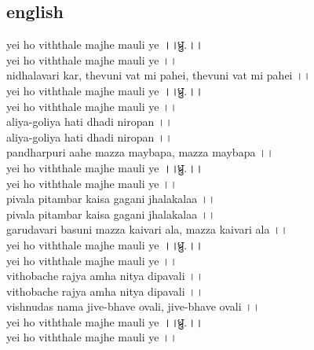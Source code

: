\documentclass[letterpaper,twocolumn,openany,nodeprecatedcode]{dndbook}
\begin{document}
\begin{flushleft}
  \subsection*{english}
  yei ho viththale majhe mauli ye ।।ध्रु.।।\\
  yei ho viththale majhe mauli ye ।।\\
  nidhalavari kar, thevuni vat mi pahei, thevuni vat mi pahei ।।\\
  yei ho viththale majhe mauli ye ।।ध्रु.।।\\
  yei ho viththale majhe mauli ye ।।\\
  aliya-goliya hati dhadi niropan ।।\\
  aliya-goliya hati dhadi niropan ।।\\
  pandharpuri aahe mazza maybapa, mazza maybapa ।।\\
  yei ho viththale majhe mauli ye ।।ध्रु.।।\\
  yei ho viththale majhe mauli ye ।।\\
  pivala pitambar kaisa gagani jhalakalaa ।।\\
  pivala pitambar kaisa gagani jhalakalaa ।।\\
  garudavari basuni mazza kaivari ala, mazza kaivari ala ।।\\
  yei ho viththale majhe mauli ye ।।ध्रु.।।\\
  yei ho viththale majhe mauli ye ।।\\
  vithobache rajya amha nitya dipavali ।।\\
  vithobache rajya amha nitya dipavali ।।\\
  vishnudas nama jive-bhave ovali, jive-bhave ovali ।।\\
  yei ho viththale majhe mauli ye ।।ध्रु.।।\\
  yei ho viththale majhe mauli ye ।।\\
\end{flushleft}
\pagebreak
\end{document}
